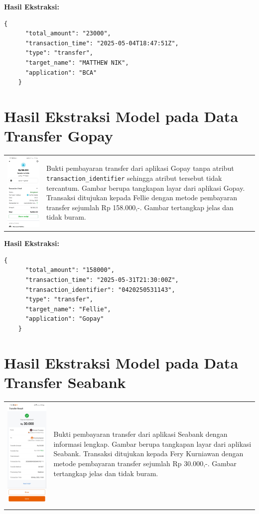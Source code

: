 \textbf{Hasil Ekstraksi:}
\begin{lstlisting}[style=jsonstyle]
    {
      "total_amount": "23000",
      "transaction_time": "2025-05-04T18:47:51Z",
      "type": "transfer",
      "target_name": "MATTHEW NIK",
      "application": "BCA"
    }
\end{lstlisting}

\clearpage

\section{Hasil Ekstraksi Model pada Data Transfer Gopay}

\begin{table}[h!]
    \centering
    \begin{tabularx}{\textwidth}{m{} X}
        \includegraphics[width=\linewidth]{images/contoh-data/tf-2.jpg}
        & 
        Bukti pembayaran transfer dari aplikasi Gopay tanpa atribut \texttt{transaction\_identifier} sehingga atribut tersebut tidak tercantum. Gambar berupa tangkapan layar dari aplikasi Gopay. Transaksi ditujukan kepada Fellie dengan metode pembayaran transfer sejumlah Rp 158.000,-. Gambar tertangkap jelas dan tidak buram. \\
    \end{tabularx}
\end{table}

\textbf{Hasil Ekstraksi:}
\begin{lstlisting}[style=jsonstyle]
    {
      "total_amount": "158000",
      "transaction_time": "2025-05-31T21:30:00Z",
      "transaction_identifier": "0420250531143",
      "type": "transfer",
      "target_name": "Fellie",
      "application": "Gopay"
    }
\end{lstlisting}

\clearpage

\section{Hasil Ekstraksi Model pada Data Transfer Seabank}

\begin{table}[h!]
    \centering
    \begin{tabularx}{\textwidth}{m{} X}
        \includegraphics[width=\linewidth]{images/contoh-data/tf-3.jpg}
        & 
        Bukti pembayaran transfer dari aplikasi Seabank dengan informasi lengkap. Gambar berupa tangkapan layar dari aplikasi Seabank. Transaksi ditujukan kepada Fery Kurniawan dengan metode pembayaran transfer sejumlah Rp 30.000,-. Gambar tertangkap jelas dan tidak buram. \\
    \end{t
\end{tabularx}
\end{table}
